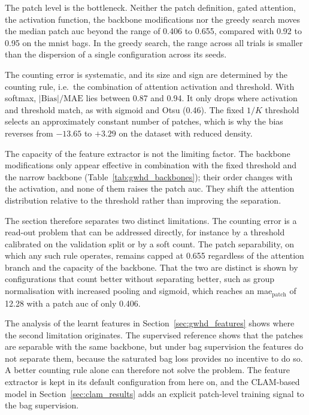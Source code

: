 \documentclass[12pt,parskip = half, DIV=classic,listof=totoc]{scrartcl}
\begin{document}
			The patch level is the bottleneck. Neither the patch definition, gated
			attention, the activation function, the backbone modifications nor the greedy search moves
			the median patch \ac{auc} beyond the range of 0.406 to 0.655, compared with 0.92 to
			0.95 on the \ac{mnist} bags. In the greedy search, the range across all trials is smaller than
			the dispersion of a single configuration across its seeds.

			The counting error is systematic, and its size and sign are determined by the
			counting rule, i.e.\ the combination of attention activation and threshold. With softmax,
			$|\mathrm{Bias}|/\mathrm{MAE}$ lies between 0.87 and 0.94. It only drops where activation
			and threshold match, as with sigmoid and Otsu (0.46). The fixed $1/K$ threshold selects an
			approximately constant number of patches, which is why the bias reverses from $-13.65$ to
			$+3.29$ on the dataset with reduced density.

			The capacity of the feature extractor is not the limiting factor. The backbone
			modifications only appear effective in combination with the fixed threshold and the narrow
			backbone (Table~\ref{tab:gwhd_backbones}); %
			their order changes with the activation, and none of them raises the patch \ac{auc}.
			They shift the attention distribution relative to the threshold rather than improving the
			separation.

			The section therefore separates two distinct limitations. The counting error is a
			read-out problem that can be addressed directly, for instance by a threshold calibrated on
			the validation split or by a soft count. The patch separability, on which any such rule
			operates, remains capped at 0.655 regardless of the attention branch and the capacity of the
			backbone. That the two are distinct is shown by configurations that count better without
			separating better, such as group normalisation with increased pooling and sigmoid, which
			reaches an \acs*{mae}$_{\text{patch}}$ of 12.28 with a patch \ac{auc} of only 0.406.

			The analysis of the learnt features in Section~\ref{sec:gwhd_features} shows where
			the second limitation originates. The supervised reference shows that the patches
			are separable with the same backbone, but under bag supervision the features do not
			separate them, because the saturated bag loss provides no incentive to do so. A
			better counting rule alone can therefore not solve the problem. The feature
			extractor is kept in its default configuration from here on, and the CLAM-based
			model in Section~\ref{sec:clam_results} %
			adds an explicit patch-level training signal to the bag supervision.
\end{document}

